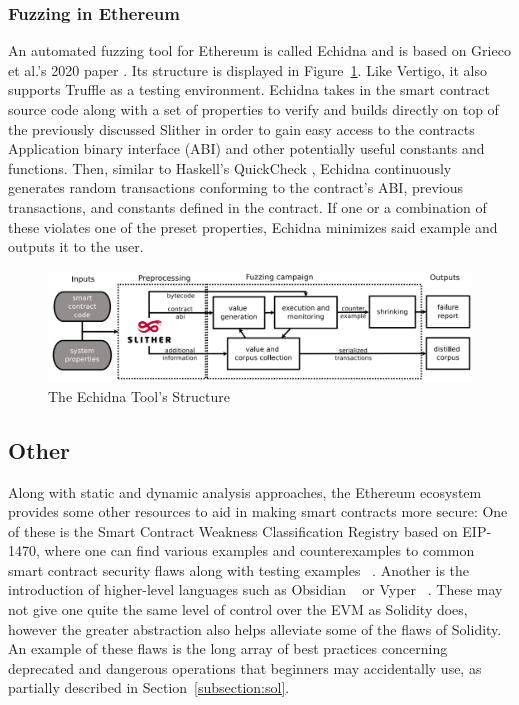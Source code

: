\documentclass[letterpaper,twocolumn,10pt]{article}
\begin{document}
\subsubsection{Fuzzing in Ethereum}

An automated fuzzing tool for Ethereum is called Echidna and is based on Grieco et al.'s 2020 paper \cite{grieco_song_cygan_feist_groce_2020}. Its structure is displayed in Figure~\ref{fig:echidna}. Like Vertigo, it also supports Truffle as a testing environment. Echidna takes in the smart contract source code along with a set of properties to verify and builds directly on top of the previously discussed Slither in order to gain easy access to the contracts Application binary interface (ABI) and other potentially useful constants and functions. Then, similar to Haskell's QuickCheck \cite{claessen_hughes_2000}, Echidna continuously generates random transactions conforming to the contract's ABI, previous transactions, and constants defined in the contract. If one or a combination of these violates one of the preset properties, Echidna minimizes said example and outputs it to the user.
\begin{figure}
\begin{center}
\includegraphics[scale=0.16]{echidna}
\end{center}
\caption{\label{fig:echidna} The Echidna Tool's Structure\cite{grieco_song_cygan_feist_groce_2020}}
\end{figure}

\subsection{Other}
Along with static and dynamic analysis approaches, the Ethereum ecosystem provides some other resources to aid in making smart contracts more secure: One of these is the Smart Contract Weakness Classification Registry based on EIP-1470, where one can find various examples and counterexamples to common smart contract security flaws along with testing examples ~\cite{SWC}. Another is the introduction of higher-level languages such as Obsidian ~\cite{7965268} or Vyper ~\cite{9223278}. These may not give one quite the same level of control over the EVM as Solidity does, however the greater abstraction also helps alleviate some of the flaws of Solidity. An example of these flaws is the long array of best practices concerning deprecated and dangerous operations that beginners may accidentally use, as partially described in Section~\ref{subsection:sol}.
\end{document}
